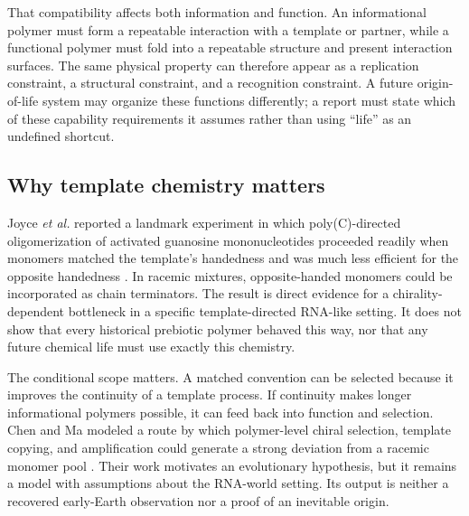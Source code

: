 \documentclass[conference]{IEEEtran}
\begin{document}
That compatibility affects both information and function. An informational polymer must form a repeatable interaction with a template or partner, while a functional polymer must fold into a repeatable structure and present interaction surfaces. The same physical property can therefore appear as a replication constraint, a structural constraint, and a recognition constraint. A future origin-of-life system may organize these functions differently; a report must state which of these capability requirements it assumes rather than using ``life'' as an undefined shortcut.

\subsection{Why template chemistry matters}

Joyce \textit{et al.} reported a landmark experiment in which poly(C)-directed oligomerization of activated guanosine mononucleotides proceeded readily when monomers matched the template's handedness and was much less efficient for the opposite handedness \cite{joyce1984}. In racemic mixtures, opposite-handed monomers could be incorporated as chain terminators. The result is direct evidence for a chirality-dependent bottleneck in a specific template-directed RNA-like setting. It does not show that every historical prebiotic polymer behaved this way, nor that any future chemical life must use exactly this chemistry.

The conditional scope matters. A matched convention can be selected because it improves the continuity of a template process. If continuity makes longer informational polymers possible, it can feed back into function and selection. Chen and Ma modeled a route by which polymer-level chiral selection, template copying, and amplification could generate a strong deviation from a racemic monomer pool \cite{chenma}. Their work motivates an evolutionary hypothesis, but it remains a model with assumptions about the RNA-world setting. Its output is neither a recovered early-Earth observation nor a proof of an inevitable origin.
\end{document}
